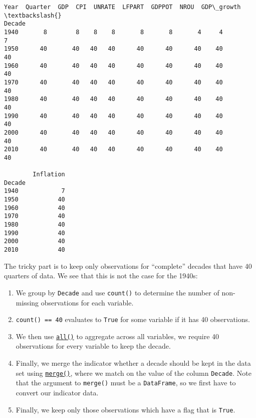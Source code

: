 \documentclass[10pt]{scrartcl}
\providecommand{\tightlist}{%
      \setlength{\itemsep}{0pt}\setlength{\parskip}{0pt}}
\begin{document}
    \begin{Verbatim}[commandchars=\\\{\}]
        Year  Quarter  GDP  CPI  UNRATE  LFPART  GDPPOT  NROU  GDP\_growth  \textbackslash{}
Decade
1940       8        8    8    8       8       8       4     4           7
1950      40       40   40   40      40      40      40    40          40
1960      40       40   40   40      40      40      40    40          40
1970      40       40   40   40      40      40      40    40          40
1980      40       40   40   40      40      40      40    40          40
1990      40       40   40   40      40      40      40    40          40
2000      40       40   40   40      40      40      40    40          40
2010      40       40   40   40      40      40      40    40          40

        Inflation
Decade
1940            7
1950           40
1960           40
1970           40
1980           40
1990           40
2000           40
2010           40
    \end{Verbatim}

    The tricky part is to keep only observations for ``complete'' decades
that have 40 quarters of data. We see that this is not the case for the
1940s:

\begin{enumerate}
\def\labelenumi{\arabic{enumi}.}
\tightlist
\item
  We group by \texttt{Decade} and use \texttt{count()} to determine the
  number of non-missing observations for each variable.
\item
  \texttt{count()\ ==\ 40} evaluates to \texttt{True} for some variable
  if it has 40 observations.
\item
  We then use
  \href{https://pandas.pydata.org/pandas-docs/stable/reference/api/pandas.DataFrame.all.html}{\texttt{all()}}
  to aggregate across all variables, \ie we require 40 observations for
  every variable to keep the decade.
\item
  Finally, we merge the indicator whether a decade should be kept in the
  data set using
  \href{https://pandas.pydata.org/pandas-docs/stable/reference/api/pandas.DataFrame.merge.html}{\texttt{merge()}},
  where we match on the value of the column \texttt{Decade}. Note that
  the argument to \texttt{merge()} must be a \texttt{DataFrame}, so we
  first have to convert our indicator data.
\item
  Finally, we keep only those observations which have a flag that is
  \texttt{True}.
\end{enumerate}
\end{document}
